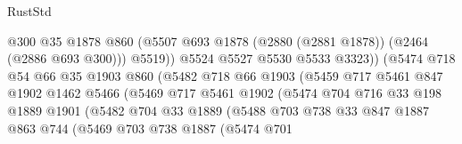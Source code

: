 \begin{lexlean}{RustStd}
\begin{coremodule}
                                    @300
                                    @35
                                    @1878
                                    @860
                                    (@5507
                                      @693
                                      @1878
                                      (@2880 (@2881 @1878))
                                      (@2464 (@2886 @693 @300)))
                                    @5519))
                                @5524
                                @5527
                                @5530
                                @5533
                                @3323))
                            (@5474
                              @718
                              @54
                              @66
                              @35
                              @1903
                              @860
                              (@5482
                                @718
                                @66
                                @1903
                                (@5459
                                  @717
                                  @5461
                                  @847
                                  @1902
                                  @1462
                                  @5466
                                  (@5469
                                    @717
                                    @5461
                                    @1902
                                    (@5474
                                      @704
                                      @716
                                      @33
                                      @198
                                      @1889
                                      @1901
                                      (@5482
                                        @704
                                        @33
                                        @1889
                                        (@5488
                                          @703
                                          @738
                                          @33
                                          @847
                                          @1887
                                          @863
                                          @744
                                          (@5469
                                            @703
                                            @738
                                            @1887
                                            (@5474
                                              @701

\end{coremodule}
\end{lexlean}

